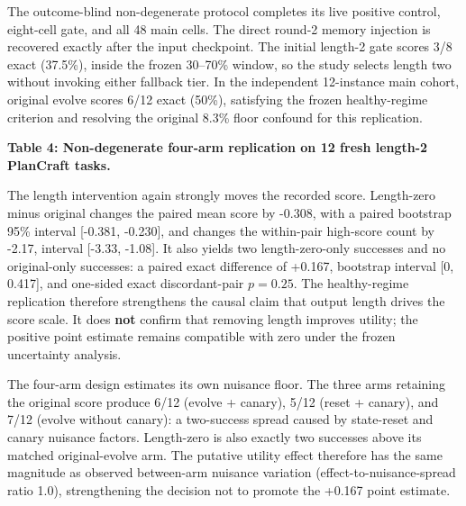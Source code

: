 \documentclass{article}
\begin{document}
The outcome-blind non-degenerate protocol completes its live positive control, eight-cell gate, and all 48 main cells. The direct round-2 memory injection is recovered exactly after the input checkpoint. The initial length-2 gate scores 3/8 exact (37.5\%), inside the frozen 30--70\% window, so the study selects length two without invoking either fallback tier. In the independent 12-instance main cohort, original evolve scores 6/12 exact (50\%), satisfying the frozen healthy-regime criterion and resolving the original 8.3\% floor confound for this replication.

\textbf{Table 4: Non-degenerate four-arm replication on 12 fresh length-2 PlanCraft tasks.}

\begin{center}
\end{center}

The length intervention again strongly moves the recorded score. Length-zero minus original changes the paired mean score by -0.308, with a paired bootstrap 95\% interval [-0.381, -0.230], and changes the within-pair high-score count by -2.17, interval [-3.33, -1.08]. It also yields two length-zero-only successes and no original-only successes: a paired exact difference of +0.167, bootstrap interval [0, 0.417], and one-sided exact discordant-pair \(p=0.25\). The healthy-regime replication therefore strengthens the causal claim that output length drives the score scale. It does \textbf{not} confirm that removing length improves utility; the positive point estimate remains compatible with zero under the frozen uncertainty analysis.

The four-arm design estimates its own nuisance floor. The three arms retaining the original score produce 6/12 (evolve + canary), 5/12 (reset + canary), and 7/12 (evolve without canary): a two-success spread caused by state-reset and canary nuisance factors. Length-zero is also exactly two successes above its matched original-evolve arm. The putative utility effect therefore has the same magnitude as observed between-arm nuisance variation (effect-to-nuisance-spread ratio 1.0), strengthening the decision not to promote the +0.167 point estimate.
\end{document}
